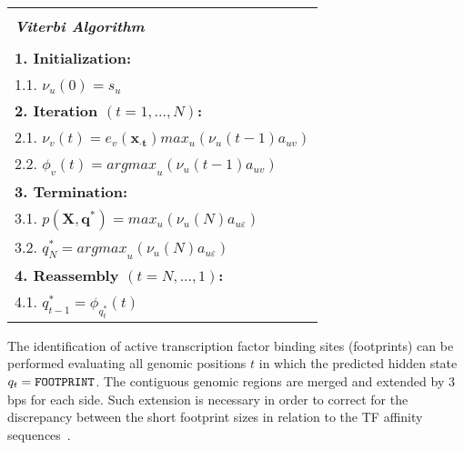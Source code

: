 \begin{center}
  \begin{spacing}{1.0}
    \begin{tabular}{l}
      \hline \\[-0.25cm]
      \hspace{1.2cm} {\large {\bf \emph{ Viterbi Algorithm } } } \hspace{1.2cm} \\[0.1cm]
      \hline \\[-0.25cm]
      \hspace{0.2cm} {\bf 1. Initialization:} \\
      \hspace{0.9cm} 1.1. $ \nu_u(0) = s_u $ \\
      \hspace{0.2cm} {\bf 2. Iteration $ (t = 1, ..., N) $:} \\
      \hspace{0.9cm} 2.1. $ \nu_v(t) = e_v(\mathbf{{x}_{\cdot t}}) {max}_u(\nu_u(t-1)a_{uv}) $ \\
      \hspace{0.9cm} 2.2. $ {\phi}_{v}(t) = {argmax}_u(\nu_u(t-1)a_{uv}) $ \\
      \hspace{0.2cm} {\bf 3. Termination:} \\
      \hspace{0.9cm} 3.1. $ p(\mathbf{X},\mathbf{q^*}) = {max}_u(\nu_u(N)a_{u\varepsilon}) $ \\
      \hspace{0.9cm} 3.2. $ q_{N}^{\ast} = {argmax}_u(\nu_u(N)a_{u\varepsilon}) $ \\
      \hspace{0.2cm} {\bf 4. Reassembly $ (t = N, ..., 1) $:} \\
      \hspace{0.9cm} 4.1. $ q_{t-1}^{\ast} = {\phi}_{q_{t}^{\ast}}(t) $ \\[0.1cm]
      \hline
    \end{tabular}
  \end{spacing}
\end{center}

The identification of active transcription factor binding sites (footprints) can be performed evaluating all genomic positions $t$ in which the predicted hidden state $ q_t = \text{{\tt FOOTPRINT}} $. The contiguous genomic regions are merged and extended by $3$ bps for each side. Such extension is necessary in order to correct for the discrepancy between the short footprint sizes in relation to the TF affinity sequences~\cite{boyle2011,gusmao2014}.


